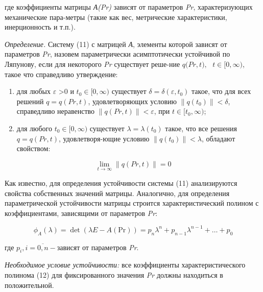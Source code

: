 где коэффициенты матрицы \emph{А(Pr)} зависят от параметров \emph{Pr},
характеризующих механические пара-метры (такие как вес, метрические
характеристики, инерционность и т.п.).

\emph{Определение.} Систему (11) с матрицей \emph{А}, элементы которой
зависят от параметров \emph{Pr}, назовем параметрически асимптотически
устойчивой по Ляпунову, если для некоторого \emph{Pr} существует реше-ние
\({q(}{Pr,}{t}{),}\text{     }{t}{\in}{\lbrack 0,}{\infty}{)}\),
такое что справедливо утверждение:
\begin{enumerate}
  \def\labelenumi{\arabic{enumi})}
  \setlength{\itemindent}{1cm}
  \item
    для любых \(\varepsilon\) \textgreater 0 и
    \({t}_{0} \in [0, \infty)\)
    существует
    \(\delta = \delta(\varepsilon, t_{0})\)
    такое, что для всех решений
    \({q} = {q}({Pr}, t)\), удовлетворяющих
    условию
    \(\left\| {q}(t_{0}) \right\| < \delta\),
    справедливо неравенство
    \(\left\| {q}({Pr}, t) \right\| < \varepsilon\),
    при
    \(t \in [t_{0}, \infty)\);
  \item
    для любого
    \(t_{0} \in [0, \infty)\)
    существует
    \(\lambda = \lambda(t_{0})\)
    такое, что все решения
    \({q} = {q}({Pr}, t)\), удовлетворя-ющие
    условию
    \(\left\| {q}(t_{0}) \right\| < \lambda\),
    обладают свойством:
  \end{enumerate}
  
\begin{equation*}
  \lim_{t \to \infty} \|q(Pr,t)\| = 0
\end{equation*}
    

Как известно, для определения устойчивости системы (11) анализируются
свойства собственных значений матрицы. Аналогично, для определения
параметрической устойчивости матрицы строится характеристический полином
с коэффициентами, зависящими от параметров \emph{Pr}:



\begin{equation}
  \phi_{A}(\lambda) = \det(\lambda E - A(\text{Pr})) = p_n \lambda^n + p_{n-1} \lambda^{n-1} + \dots + p_0
  \tag{12}
\end{equation}





где
\({p}_{{i}}{,i =}\overline{{0,n}}{-}\)зависят
от параметров \emph{Pr}.


\emph{Необходимое условие устойчивости:} все коэффициенты
характеристического полинома (12) для фиксированного значения \emph{Pr}
должны находиться в положительной.

